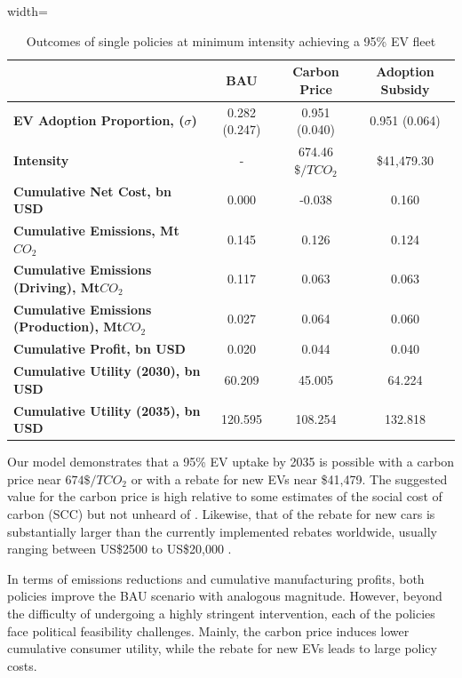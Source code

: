 \documentclass[12pt]{article}
\begin{document}
    \begin{table}[h!]
	\centering
	\caption{Outcomes of single policies at minimum intensity achieving a 95\% EV fleet}
	\label{tab:policy_outcomes}
	\begin{adjustbox}{width=\textwidth}
		\begin{tabular}{lccc}
			\toprule
			& \textbf{BAU} & \textbf{Carbon Price} & \textbf{Adoption Subsidy} \\
			\midrule
			\textbf{EV Adoption Proportion, ($\sigma$)} & 0.282 (0.247) & 0.951 (0.040) & 0.951 (0.064) \\
			\textbf{Intensity} & - & 674.46 $\$/TCO_2$ & \$41{,}479.30 \\
			\textbf{Cumulative Net Cost, bn USD} & 0.000 & -0.038 & 0.160 \\
			\textbf{Cumulative Emissions, Mt$CO_2$} & 0.145 & 0.126 & 0.124 \\
			\textbf{Cumulative Emissions (Driving), Mt$CO_2$} & 0.117 & 0.063 & 0.063 \\
			\textbf{Cumulative Emissions (Production), Mt$CO_2$} & 0.027 & 0.064 & 0.060 \\
			\textbf{Cumulative Profit, bn USD} & 0.020 & 0.044 & 0.040 \\
			\textbf{Cumulative Utility (2030), bn USD} & 60.209 & 45.005 & 64.224 \\
			\textbf{Cumulative Utility (2035), bn USD} & 120.595 & 108.254 & 132.818 \\
			\bottomrule
		\end{tabular}
	\end{adjustbox}
\end{table}

	Our model demonstrates that a 95\% EV uptake by 2035 is possible with a carbon price near $674\$/TCO_2$ or with a rebate for new EVs near \$41{,}479. The suggested value for the carbon price is high relative to some estimates of the social cost of carbon (SCC) but not unheard of \citep{moore2024synthesis, bilal2024macroeconomic}. Likewise, that of the rebate for new cars is substantially larger than the currently implemented rebates worldwide, usually ranging between US\$2500 to US\$20,000 \cite{HARDMAN2017EVRebate}.

    In terms of emissions reductions and cumulative manufacturing profits, both policies improve the BAU scenario with analogous magnitude. However, beyond the difficulty of undergoing a highly stringent intervention, each of the policies face political feasibility challenges. Mainly, the carbon price induces lower cumulative consumer utility, while the rebate for new EVs leads to large policy costs.
\end{document}
